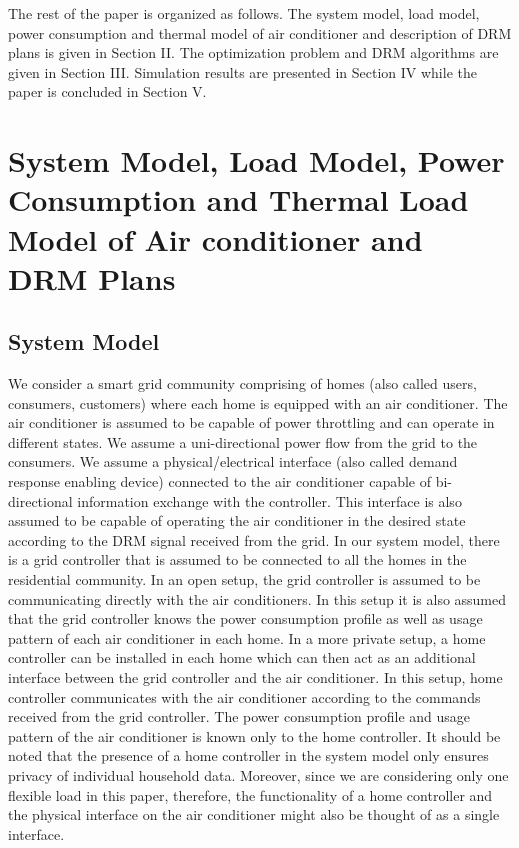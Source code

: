 \documentclass[10pt,twocolumn,twoside]{IEEEtran}
\begin{document}
The rest of the paper is organized as follows. The system model, load model, power consumption and thermal model of air conditioner and description of DRM plans is given in Section II. The optimization problem and DRM algorithms are given in Section III. Simulation results are presented in Section IV while the paper is concluded in Section V.
 
 
\section{System Model, Load Model, Power Consumption and Thermal Load Model of Air conditioner and DRM Plans}

\subsection{System Model} 
We consider a smart grid community comprising of  homes (also called users, consumers, customers) where each home is equipped with an air conditioner. The air conditioner is assumed to be capable of power throttling and can operate in  different states. We assume a uni-directional power flow from the grid to the consumers. We assume a physical/electrical interface (also called demand response enabling device) \cite{aus_stand} connected to the air conditioner capable of bi-directional information exchange with the controller. This interface is also assumed to be capable of operating the air conditioner in the desired state according to the DRM signal received from the grid. 
In our system model, there is a grid controller that is assumed to be connected to all the homes in the residential community. In an open setup, the grid controller is assumed to be communicating directly with the air conditioners. In this setup it is also assumed that the grid controller knows the power consumption profile as well as usage pattern of each air conditioner in each home. In a more private setup, a home controller can be installed in each home which can then act as an additional interface between the grid controller and the air conditioner. In this setup, home controller communicates with the air conditioner according to the commands received from the grid controller. The power consumption profile and usage pattern of the air conditioner is known only to the home controller. It should be noted that the presence of a home controller in the system model only ensures privacy of individual household data. Moreover, since we are considering only one flexible load in this paper, therefore, the functionality of a home controller and the physical interface on the air conditioner might also be thought of as a single interface. 
\end{document}

